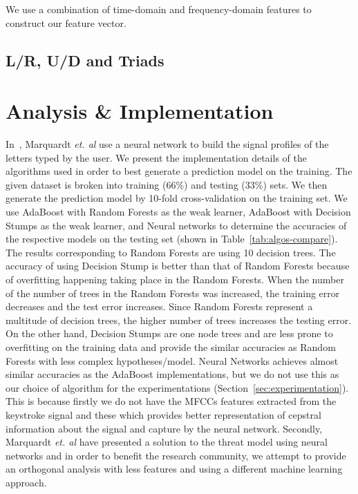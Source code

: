 \documentclass[11pt,conference]{IEEEtran}
\begin{document}
We use a combination of time-domain and frequency-domain features to construct our feature vector. 

\subsection{L/R, U/D and Triads}

\section{Analysis \& Implementation}
\label{sec:implementation}
\noindent In~\cite{spiphone}, Marquardt \emph{et. al} use a neural network to build the signal profiles of the letters typed by the user. We present the implementation details of the algorithms used in order to best generate a prediction model on the training. The given dataset is broken into training (66\%) and testing (33\%) sets. We then generate the prediction model by 10-fold cross-validation on the training set. We use AdaBoost with Random Forests as the weak learner, AdaBoost with Decision Stumps as the weak learner, and Neural networks to determine the accuracies of the respective models on the testing set (shown in Table~\ref{tab:algos-compare}). The results corresponding to Random Forests are using 10 decision trees. The accuracy of using Decision Stump is better than that of Random Forests because of overfitting happening taking place in the Random Forests. When the number of the number of trees in the Random Forests was increased, the training error decreases and the test error increases. Since Random Forests represent a multitude of decision trees, the higher number of trees increases the testing error. On the other hand, Decision Stumps are one node trees and are less prone to overfitting on the training data and provide the similar accuracies as Random Forests with less complex hypotheses/model. Neural Networks achieves almost similar accuracies as the AdaBoost implementations, but we do not use this as our choice of algorithm for the experimentations (Section~\ref{sec:experimentation}). This is because firstly we do not have the MFCCs features extracted from the keystroke signal and these which provides better representation of cepstral information about the signal and capture by the neural network. Secondly, Marquardt \emph{et. al} have presented a solution to the threat model using neural networks and in order to benefit the research community, we attempt to provide an orthogonal analysis with less features and using a different machine learning approach.
\end{document}
